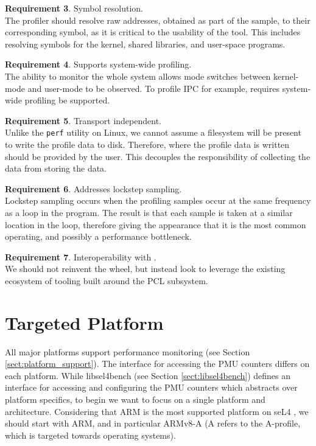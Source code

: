 \textbf{Requirement 3}. Symbol resolution.\\
The profiler should resolve raw addresses, obtained as part of the sample, to their corresponding symbol, as it is critical to the usability of the tool. This includes resolving symbols for the kernel, shared libraries, and user-space programs.

\textbf{Requirement 4}. Supports system-wide profiling.\\
The ability to monitor the whole system allows mode switches between kernel-mode and user-mode to be observed. To profile IPC for example, requires system-wide profiling be supported. 

\textbf{Requirement 5}. Transport independent.\\
Unlike the \texttt{perf} utility on Linux, we cannot assume a filesystem will be present to write the profile data to disk. Therefore, where the profile data is written should be provided by the user. This decouples the responsibility of collecting the data from storing the data.

\textbf{Requirement 6}. Addresses lockstep sampling.\\
Lockstep sampling occurs when the profiling samples occur at the same frequency as a loop in the program. The result is that each sample is taken at a similar location in the loop, therefore giving the appearance that it is the most common operating, and possibly a performance bottleneck.

\textbf{Requirement 7}. Interoperability with .\\
We should not reinvent the wheel, but instead look to leverage the existing ecosystem of tooling built around the PCL subsystem. 

\section{Targeted Platform}

All major platforms support performance monitoring (see Section \ref{sect:platform_support}). The interface for accessing the PMU counters differs on each platform. While libsel4bench (see Section \ref{sect:libsel4bench}) defines an interface for accessing and configuring the PMU counters \cite{github_libsel4bench_sel4bench_header} which abstracts over platform specifics, to begin we want to focus on a single platform and architecture. Considering that ARM is the most supported platform on seL4 \cite{DocsSeL4Hardware}, we should start with ARM, and in particular ARMv8-A (A refers to the A-profile, which is targeted towards operating systems).

